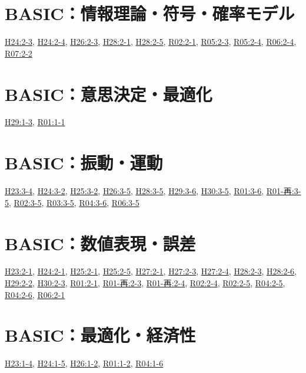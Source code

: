 \section{BASIC：情報理論・符号・確率モデル}
\hyperref[q:h24-reg-basic-2-3]{H24:2-3}, \hyperref[q:h24-reg-basic-2-4]{H24:2-4}, \hyperref[q:h26-reg-basic-2-3]{H26:2-3}, \hyperref[q:h28-reg-basic-2-1]{H28:2-1}, \hyperref[q:h28-reg-basic-2-5]{H28:2-5}, \hyperref[q:r02-reg-basic-2-1]{R02:2-1}, \hyperref[q:r05-reg-basic-2-3]{R05:2-3}, \hyperref[q:r05-reg-basic-2-4]{R05:2-4}, \hyperref[q:r06-reg-basic-2-4]{R06:2-4}, \hyperref[q:r07-reg-basic-2-2]{R07:2-2}
\section{BASIC：意思決定・最適化}
\hyperref[q:h29-reg-basic-1-3]{H29:1-3}, \hyperref[q:r01-reg-basic-1-1]{R01:1-1}
\section{BASIC：振動・運動}
\hyperref[q:h23-reg-basic-3-4]{H23:3-4}, \hyperref[q:h24-reg-basic-3-2]{H24:3-2}, \hyperref[q:h25-reg-basic-3-2]{H25:3-2}, \hyperref[q:h26-reg-basic-3-5]{H26:3-5}, \hyperref[q:h28-reg-basic-3-5]{H28:3-5}, \hyperref[q:h29-reg-basic-3-6]{H29:3-6}, \hyperref[q:h30-reg-basic-3-5]{H30:3-5}, \hyperref[q:r01-reg-basic-3-6]{R01:3-6}, \hyperref[q:r01-ret-basic-3-5]{R01-再:3-5}, \hyperref[q:r02-reg-basic-3-5]{R02:3-5}, \hyperref[q:r03-reg-basic-3-5]{R03:3-5}, \hyperref[q:r04-reg-basic-3-6]{R04:3-6}, \hyperref[q:r06-reg-basic-3-5]{R06:3-5}
\section{BASIC：数値表現・誤差}
\hyperref[q:h23-reg-basic-2-1]{H23:2-1}, \hyperref[q:h24-reg-basic-2-1]{H24:2-1}, \hyperref[q:h25-reg-basic-2-1]{H25:2-1}, \hyperref[q:h25-reg-basic-2-5]{H25:2-5}, \hyperref[q:h27-reg-basic-2-1]{H27:2-1}, \hyperref[q:h27-reg-basic-2-3]{H27:2-3}, \hyperref[q:h27-reg-basic-2-4]{H27:2-4}, \hyperref[q:h28-reg-basic-2-3]{H28:2-3}, \hyperref[q:h28-reg-basic-2-6]{H28:2-6}, \hyperref[q:h29-reg-basic-2-2]{H29:2-2}, \hyperref[q:h30-reg-basic-2-3]{H30:2-3}, \hyperref[q:r01-reg-basic-2-1]{R01:2-1}, \hyperref[q:r01-ret-basic-2-3]{R01-再:2-3}, \hyperref[q:r01-ret-basic-2-4]{R01-再:2-4}, \hyperref[q:r02-reg-basic-2-4]{R02:2-4}, \hyperref[q:r02-reg-basic-2-5]{R02:2-5}, \hyperref[q:r04-reg-basic-2-5]{R04:2-5}, \hyperref[q:r04-reg-basic-2-6]{R04:2-6}, \hyperref[q:r06-reg-basic-2-1]{R06:2-1}
\section{BASIC：最適化・経済性}
\hyperref[q:h23-reg-basic-1-4]{H23:1-4}, \hyperref[q:h24-reg-basic-1-5]{H24:1-5}, \hyperref[q:h26-reg-basic-1-2]{H26:1-2}, \hyperref[q:r01-reg-basic-1-2]{R01:1-2}, \hyperref[q:r04-reg-basic-1-6]{R04:1-6}
